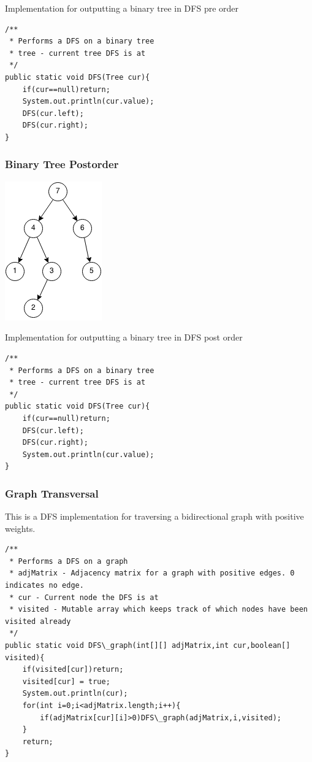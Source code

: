 \documentclass[11pt,oneside]{book}
\makeatletter
\def\maxwidth#1{\ifdim\Gin@nat@width>#1 #1\else\Gin@nat@width\fi}
\makeatother
\begin{document}
Implementation for outputting a binary tree in DFS pre order

\begin{lstlisting}
/**
 * Performs a DFS on a binary tree
 * tree - current tree DFS is at
 */
public static void DFS(Tree cur){
    if(cur==null)return;
    System.out.println(cur.value);
    DFS(cur.left);
    DFS(cur.right);
}
\end{lstlisting}

\subsubsection{Binary Tree Postorder}

\includegraphics[width=\maxwidth{\textwidth}]{dfs-postorder.png}

Implementation for outputting a binary tree in DFS post order

\begin{lstlisting}
/**
 * Performs a DFS on a binary tree
 * tree - current tree DFS is at
 */
public static void DFS(Tree cur){
    if(cur==null)return;
    DFS(cur.left);
    DFS(cur.right);
    System.out.println(cur.value);
}
\end{lstlisting}

\subsubsection{Graph Transversal}

This is a DFS implementation for traversing a bidirectional graph with positive weights.

\begin{lstlisting}
/**
 * Performs a DFS on a graph
 * adjMatrix - Adjacency matrix for a graph with positive edges. 0 indicates no edge.
 * cur - Current node the DFS is at
 * visited - Mutable array which keeps track of which nodes have been visited already
 */
public static void DFS\_graph(int[][] adjMatrix,int cur,boolean[] visited){
    if(visited[cur])return;
    visited[cur] = true;
    System.out.println(cur);
    for(int i=0;i<adjMatrix.length;i++){
        if(adjMatrix[cur][i]>0)DFS\_graph(adjMatrix,i,visited);
    }
    return;
}

\end{lstlisting}
\end{document}
